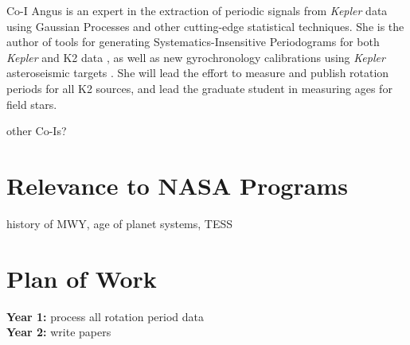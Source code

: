 \documentclass[12pt]{article}
\newcommand{\Kepler}{\textsl{Kepler}\xspace}
\begin{document}
Co-I Angus is an expert in the extraction of periodic signals from \Kepler data using Gaussian Processes \citep{angus2016c} and other cutting-edge statistical techniques. She is the author of tools for generating Systematics-Insensitive Periodograms for both \Kepler and K2 data \citep{angus2016}, as well as new gyrochronology calibrations using \Kepler asteroseismic targets \citep{angus2015}. She will lead the effort to measure and publish rotation periods for all K2 sources, and lead the graduate student in measuring ages for field stars.

other Co-Is?

\section{Relevance to NASA Programs}
history of MWY, age of planet systems, TESS



\section{Plan of Work}
{\bf Year 1:} process all rotation period data
\\
{\bf Year 2:} write papers



\clearpage


\end{document}
